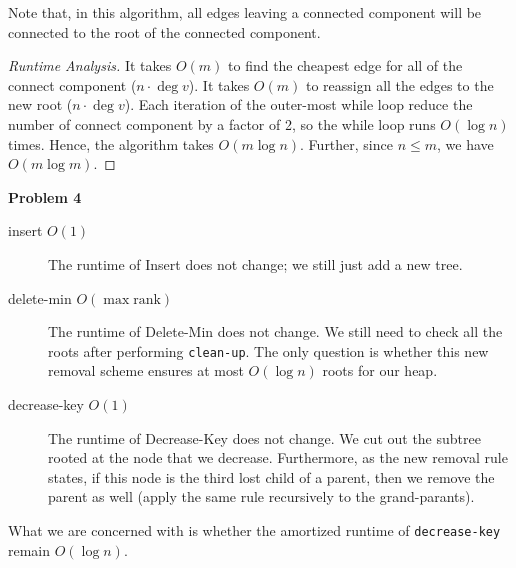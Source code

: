 \documentclass[a4paper]{/home/dawei/.dotfiles/templates/preamble}
\begin{document}
\begin{enumerate}[label = (\alph*)]
\begin{algorithmic}
        \EndFor{}
           
        \EndFor{}
      \EndWhile{}
    \end{algorithmic}
    Note that, in this algorithm, all edges leaving a connected component will be
    connected to the root of the connected component.
    \begin{proof}[Runtime Analysis]{}
      It takes $O(m)$ to find the cheapest edge for all of the connect
      component ($n \cdot \deg{v}$). It takes $O(m)$ to reassign all the edges
      to the new root ($n \cdot \deg{v}$). Each iteration of the outer-most
      while loop reduce the number of connect component by a factor of 2, so
      the while loop runs $O(\log{n})$ times. Hence, the algorithm takes $O(m
      \log{n})$. Further, since $n \le m$, we have $O(m \log{m})$.
    \end{proof}
\end{enumerate}

\noindent\textbf{Problem 4}
\begin{description}
  \item[insert $O(1)$] The runtime of Insert does not change; we still just add
    a new tree.
  \item[delete-min $O(\max{\mathrm{rank}})$] The runtime of Delete-Min does not
    change. We still need to check all the roots after performing
    \texttt{clean-up}. The only question is whether this new removal scheme
    ensures at most $O(\log n)$ roots for our heap.
  \item[decrease-key $O(1)$] The runtime of Decrease-Key does not change. We
    cut out the subtree rooted at the node that we decrease. Furthermore, as
    the new removal rule states, if this node is the third lost child of
    a parent, then we remove the parent as well (apply the same rule
    recursively to the grand-parants).
\end{description}
What we are concerned with is whether the amortized runtime of
\texttt{decrease-key} remain $O(\log n)$.
\end{document}
